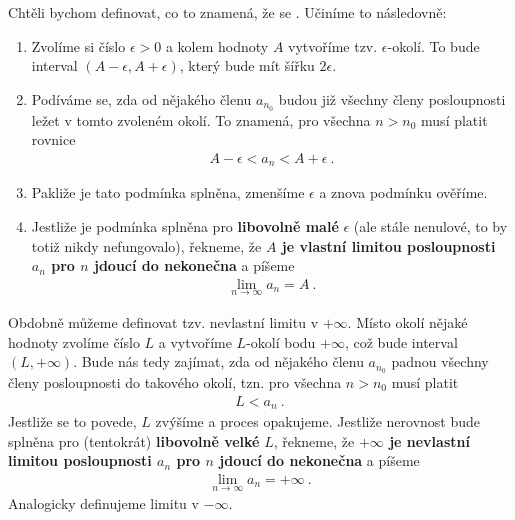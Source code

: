 Chtěli bychom definovat, co to znamená, že se . Učiníme to následovně:
\begin{enumerate}
    \item Zvolíme si číslo $\epsilon>0$ a kolem hodnoty $A$ vytvoříme tzv. $\epsilon$-okolí. To bude interval $(A-\epsilon, A+\epsilon)$, který bude mít šířku $2 \epsilon$.
    \item Podíváme se, zda od nějakého členu $a_{n_0}$ budou již všechny členy posloupnosti ležet v tomto zvoleném okolí. To znamená, pro všechna $n>n_0$ musí platit rovnice
    \begin{align}
        A - \epsilon < a_n < A + \epsilon \:.
    \end{align}
    \item Pakliže je tato podmínka splněna, zmenšíme $\epsilon$ a znova podmínku ověříme.
    \item Jestliže je podmínka splněna pro \textbf{libovolně malé} $\epsilon$ (ale stále nenulové, to by totiž nikdy nefungovalo), řekneme, že \textbf{$A$ je vlastní limitou posloupnosti $a_n$ pro $n$ jdoucí do nekonečna} a píšeme \begin{align}
        \lim_{n \rightarrow \infty} a_n = A \:.
    \end{align}
\end{enumerate}
Obdobně můžeme definovat tzv. nevlastní limitu v $+\infty$. Místo okolí nějaké hodnoty zvolíme číslo $L$ a vytvoříme $L$-okolí bodu $+\infty$, což bude interval $(L,+\infty)$. Bude nás tedy zajímat, zda od nějakého členu $a_{n_0}$ padnou všechny členy posloupnosti do takového okolí, tzn. pro všechna $n>n_0$ musí platit
\begin{align}
    L < a_n \:.
\end{align}
Jestliže se to povede, $L$ zvýšíme a proces opakujeme. Jestliže nerovnost bude splněna pro (tentokrát) \textbf{libovolně velké} $L$, řekneme, že \textbf{$+\infty$ je nevlastní limitou posloupnosti $a_n$ pro $n$ jdoucí do nekonečna} a píšeme
\begin{align}
    \lim_{n \rightarrow \infty} a_n = + \infty \:.
\end{align}
Analogicky definujeme limitu v $-\infty$.

